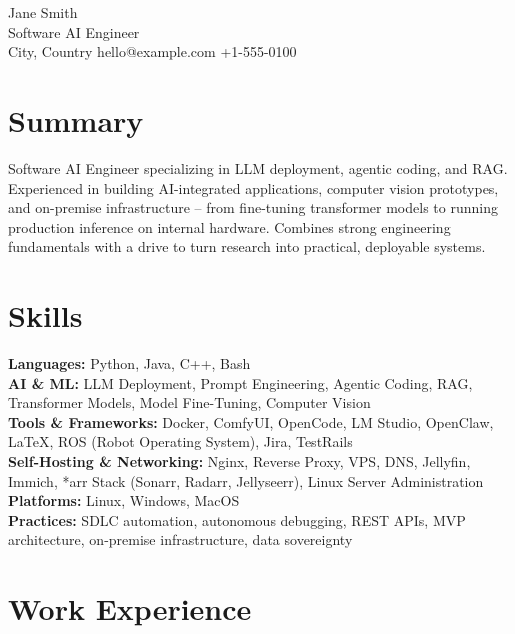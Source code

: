 \documentclass[11pt]{article}
\begin{document}
\begin{center}
{\fontsize{23pt}{28pt}\poppinsbold Jane Smith}\\[3pt]
{\fontsize{11pt}{14pt}\poppinslight\color{accent}Software AI Engineer}\\[3pt]
{\fontsize{8pt}{10pt}\poppinslight
  City, Country \textbar{} hello@example.com \textbar{} +1-555-0100}
\end{center}

\section{Summary}
{\fontsize{8pt}{12pt}\poppinslight
Software AI Engineer specializing in LLM deployment, agentic coding, and RAG.
Experienced in building AI-integrated applications, computer vision prototypes,
and on-premise infrastructure -- from fine-tuning transformer models to running
production inference on internal hardware. Combines strong engineering
fundamentals with a drive to turn research into practical, deployable systems.
}

\section{Skills}
{\fontsize{8pt}{12pt}\poppinslight
\textbf{Languages:} Python, Java, C++, Bash\\
\textbf{AI \& ML:} LLM Deployment, Prompt Engineering, Agentic Coding, RAG,
Transformer Models, Model Fine-Tuning, Computer Vision\\
\textbf{Tools \& Frameworks:} Docker, ComfyUI, OpenCode, LM Studio, OpenClaw,
LaTeX, ROS (Robot Operating System), Jira, TestRails\\
\textbf{Self-Hosting \& Networking:} Nginx, Reverse Proxy, VPS, DNS, Jellyfin,
Immich, *arr Stack (Sonarr, Radarr, Jellyseerr), Linux Server Administration\\
\textbf{Platforms:} Linux, Windows, MacOS\\
\textbf{Practices:} SDLC automation, autonomous debugging, REST APIs, MVP architecture,
on-premise infrastructure, data sovereignty
}

\section{Work Experience}
\end{document}
